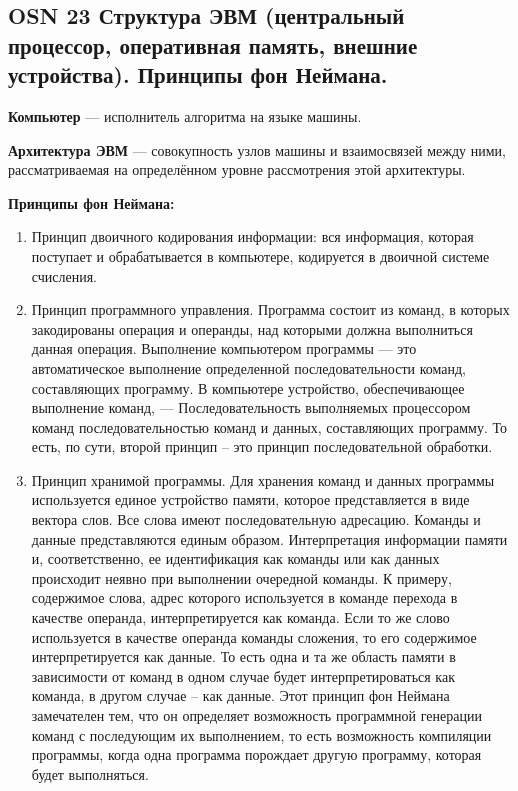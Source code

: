 \subsection{OSN 23 Структура ЭВМ (центральный процессор, оперативная память, внешние устройства). Принципы фон Неймана.}


\textbf{Компьютер} --- исполнитель алгоритма на языке машины.

\textbf{Архитектура ЭВМ} --- совокупность узлов машины и взаимосвязей между ними, рассматриваемая на определённом уровне рассмотрения этой архитектуры.

\textbf{Принципы фон Неймана:}
\begin{enumerate}
    \item Принцип двоичного кодирования информации: вся информация, которая поступает и обрабатывается в компьютере, кодируется в двоичной системе счисления.
    \item Принцип программного управления. Программа состоит из команд, в которых закодированы операция и операнды, над которыми должна выполниться данная операция. Выполнение компьютером программы — это автоматическое выполнение определенной последовательности команд, составляющих программу. В компьютере устройство, обеспечивающее выполнение команд, — Последовательность выполняемых процессором команд последовательностью команд и данных, составляющих программу. То есть, по сути, второй принцип – это принцип последовательной обработки.
    \item Принцип хранимой программы. Для хранения команд и данных программы используется единое устройство памяти, которое представляется в виде вектора слов. Все слова имеют последовательную адресацию. Команды и данные представляются единым образом. Интерпретация информации памяти и, соответственно, ее идентификация как команды или как данных происходит неявно при выполнении очередной команды. К примеру, содержимое слова, адрес которого используется в команде перехода в качестве операнда, интерпретируется как команда. Если то же слово используется в качестве операнда команды сложения, то его содержимое интерпретируется как данные. То есть одна и та же область памяти в зависимости от команд в одном случае будет интерпретироваться как команда, в другом случае – как данные. Этот принцип фон Неймана замечателен тем, что он определяет возможность программной генерации команд с последующим их выполнением, то есть возможность компиляции программы, когда одна программа порождает другую программу, которая будет выполняться.
\end{enumerate}

